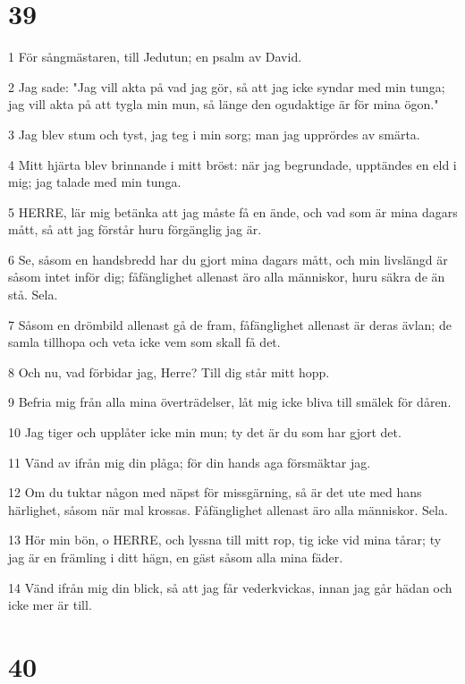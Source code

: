 \chapter{39}

\par 1 För sångmästaren, till Jedutun; en psalm av David.
\par 2 Jag sade: "Jag vill akta på vad jag gör, så att jag icke syndar med min tunga; jag vill akta på att tygla min mun, så länge den ogudaktige är för mina ögon."
\par 3 Jag blev stum och tyst, jag teg i min sorg; man jag upprördes av smärta.
\par 4 Mitt hjärta blev brinnande i mitt bröst: när jag begrundade, upptändes en eld i mig; jag talade med min tunga.
\par 5 HERRE, lär mig betänka att jag måste få en ände, och vad som är mina dagars mått, så att jag förstår huru förgänglig jag är.
\par 6 Se, såsom en handsbredd har du gjort mina dagars mått, och min livslängd är såsom intet inför dig; fåfänglighet allenast äro alla människor, huru säkra de än stå. Sela.
\par 7 Såsom en drömbild allenast gå de fram, fåfänglighet allenast är deras ävlan; de samla tillhopa och veta icke vem som skall få det.
\par 8 Och nu, vad förbidar jag, Herre? Till dig står mitt hopp.
\par 9 Befria mig från alla mina överträdelser, låt mig icke bliva till smälek för dåren.
\par 10 Jag tiger och upplåter icke min mun; ty det är du som har gjort det.
\par 11 Vänd av ifrån mig din plåga; för din hands aga försmäktar jag.
\par 12 Om du tuktar någon med näpst för missgärning, så är det ute med hans härlighet, såsom när mal krossas. Fåfänglighet allenast äro alla människor. Sela.
\par 13 Hör min bön, o HERRE, och lyssna till mitt rop, tig icke vid mina tårar; ty jag är en främling i ditt hägn, en gäst såsom alla mina fäder.
\par 14 Vänd ifrån mig din blick, så att jag får vederkvickas, innan jag går hädan och icke mer är till.

\chapter{40}

